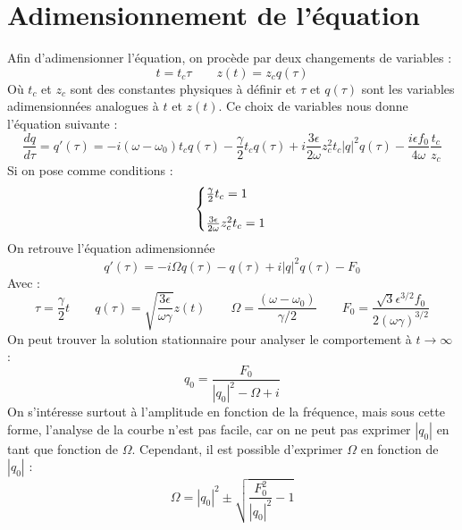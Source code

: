 \section{Adimensionnement de l'équation}
%
Afin d'adimensionner l'équation, on procède par deux changements de variables :
%
\begin{equation}
    t = t_c \tau
    \qquad 
    z(t) = z_c q(\tau)
\end{equation}
Où $t_c$ et $z_c$ sont des constantes physiques à définir et $\tau$ et $q(\tau)$ sont les variables adimensionnées analogues à $t$ et $z(t)$.
Ce choix de variables nous donne l'équation suivante :
%
\begin{equation}
    \frac{dq}{d\tau} = q'(\tau) = -i(\omega - \omega_0)t_c q(\tau) - \frac{\gamma}{2}t_c q(\tau) + i \frac{3\epsilon}{2\omega}z_c^2t_c |q|^2q(\tau) - \frac{i\epsilon f_0}{4\omega}\frac{t_c}{z_c}
\end{equation}
%
Si on pose comme conditions :
%
\begin{equation}
    \left\{
    \begin{array}{@{}l@{}}
        \frac{\gamma}{2}t_c = 1 \\
        \\
        \frac{3\epsilon}{2\omega}z_c^2t_c = 1
    \end{array}
    \right.\,
\end{equation}
%
On retrouve l'équation adimensionnée
%
\begin{equation}
    q'(\tau) = -i\Omega q(\tau) - q(\tau) + i|q|^2q(\tau) - F_0
\end{equation}
%
Avec :
%
\begin{equation}
    \tau = \frac{\gamma}{2}t
    \qquad
    q(\tau) = \sqrt{\frac{3\epsilon}{\omega\gamma}}z(t)
    \qquad
    \Omega = \frac{(\omega - \omega_0)}{\gamma/2}
    \qquad
    F_0 = \frac{\sqrt{3}\epsilon^{3/2} f_0}{2(\omega \gamma)^{3/2}}
\end{equation}
%
On peut trouver la solution stationnaire pour analyser le comportement à $t\to\infty$ :
%
\begin{equation}
    q_0 = \frac{F_0}{|q_0|^2 - \Omega + i}
    \label{eq:duff_stationnaire}
\end{equation}
%
On s'intéresse surtout à l'amplitude en fonction de la fréquence, 
mais sous cette forme, l'analyse de la courbe n'est pas facile, car on ne peut pas exprimer $|q_0|$ en tant que fonction de $\Omega$. 
Cependant, il est possible d'exprimer $\Omega$ en fonction de $|q_0|$ :
%
\begin{equation}
    \Omega = |q_0|^2 \pm \sqrt{\frac{F_0^2}{|q_0|^2} - 1 }
    \label{eq:duff_response}
\end{equation}

